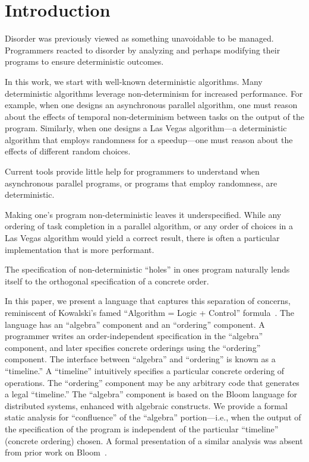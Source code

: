 \section{Introduction}
\label{sec:intro}

Disorder was previously viewed as something unavoidable to be managed.  Programmers reacted to disorder by analyzing and perhaps modifying their programs to ensure deterministic outcomes.~\cite{cidr11}

In this work, we start with well-known deterministic algorithms.  Many deterministic algorithms leverage non-determinism for increased performance.  For example, when one designs an asynchronous parallel algorithm, one must reason about the effects of temporal non-determinism between tasks on the output of the program.  Similarly, when one designs a Las Vegas algorithm---a deterministic algorithm that employs randomness for a speedup---one must reason about the effects of different random choices.

Current tools provide little help for programmers to understand when asynchronous parallel programs, or programs that employ randomness, are deterministic.

Making one's program non-deterministic leaves it underspecified.  While any ordering of task completion in a parallel algorithm, or any order of choices in a Las Vegas algorithm would yield a correct result, there is often a particular implementation that is more performant.

The specification of non-deterministic ``holes'' in ones program naturally lends itself to the orthogonal specification of a concrete order.

In this paper, we present a language that captures this separation of concerns, reminiscent of Kowalski's famed ``Algorithm = Logic + Control'' formula~\cite{alc}.  The language has an ``algebra'' component and an ``ordering'' component.  A programmer writes an order-independent specification in the ``algebra'' component, and later specifies concrete orderings using the ``ordering'' component.  The interface between ``algebra'' and ``ordering'' is known as a ``timeline.''  A ``timeline'' intuitively specifies a particular concrete ordering of operations.  The ``ordering'' component may be any arbitrary code that generates a legal ``timeline.''  The ``algebra'' component is based on the Bloom language for distributed systems, enhanced with algebraic constructs.  We provide a formal static analysis for ``confluence'' of the ``algebra'' portion---i.e., when the output of the specification of the program is independent of the particular ``timeline'' (concrete ordering) chosen.  A formal presentation of a similar analysis was absent from prior work on Bloom~\cite{this-tr}.

